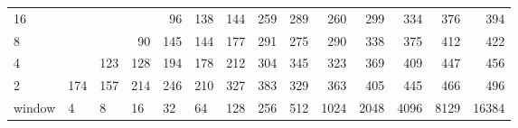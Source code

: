 \begin{table}[h]
{\begin{tabular}{lrrrrrrrrrrrrr}
			\multicolumn{1}{|l|}{16} &  &  &  & \cellcolor[HTML]{99E600}96 & \cellcolor[HTML]{99E600}138 & \cellcolor[HTML]{99E600}144 & \cellcolor[HTML]{E60000}259 & \cellcolor[HTML]{E60000}289 & \cellcolor[HTML]{E60000}260 & \cellcolor[HTML]{E60000}299 & \cellcolor[HTML]{9900E6}334 & \cellcolor[HTML]{9900E6}376 & \cellcolor[HTML]{9900E6}394 \\ \cline{1-1}
			\multicolumn{1}{|l|}{8} &  &  & \cellcolor[HTML]{99E600}90 & \cellcolor[HTML]{99E600}145 & \cellcolor[HTML]{99E600}144 & \cellcolor[HTML]{E69900}177 & \cellcolor[HTML]{E60000}291 & \cellcolor[HTML]{E60000}275 & \cellcolor[HTML]{E60000}290 & \cellcolor[HTML]{9900E6}338 & \cellcolor[HTML]{9900E6}375 & \cellcolor[HTML]{4C00E6}412 & \cellcolor[HTML]{4C00E6}422 \\ \cline{1-1}
			\multicolumn{1}{|l|}{4} &  & \cellcolor[HTML]{99E600}123 & \cellcolor[HTML]{99E600}128 & \cellcolor[HTML]{E69900}194 & \cellcolor[HTML]{E69900}178 & \cellcolor[HTML]{E69900}212 & \cellcolor[HTML]{E60000}304 & \cellcolor[HTML]{9900E6}345 & \cellcolor[HTML]{E60000}323 & \cellcolor[HTML]{9900E6}369 & \cellcolor[HTML]{9900E6}409 & \cellcolor[HTML]{4C00E6}447 & \cellcolor[HTML]{4C00E6}456 \\ \cline{1-1}
			\multicolumn{1}{|l|}{2} & \cellcolor[HTML]{E69900}174 & \cellcolor[HTML]{E69900}157 & \cellcolor[HTML]{E69900}214 & \cellcolor[HTML]{E69900}246 & \cellcolor[HTML]{E69900}210 & \cellcolor[HTML]{9900E6}327 & \cellcolor[HTML]{9900E6}383 & \cellcolor[HTML]{9900E6}329 & \cellcolor[HTML]{9900E6}363 & \cellcolor[HTML]{9900E6}405 & \cellcolor[HTML]{4C00E6}445 & \cellcolor[HTML]{4C00E6}466 & \cellcolor[HTML]{4C00E6}496 \\ \hline
			\multicolumn{1}{l|}{window} & \multicolumn{1}{l|}{4} & \multicolumn{1}{l|}{8} & \multicolumn{1}{l|}{16} & \multicolumn{1}{l|}{32} & \multicolumn{1}{l|}{64} & \multicolumn{1}{l|}{128} & \multicolumn{1}{l|}{256} & \multicolumn{1}{l|}{512} & \multicolumn{1}{l|}{1024} & \multicolumn{1}{l|}{2048} & \multicolumn{1}{l|}{4096} & \multicolumn{1}{l|}{8129} & \multicolumn{1}{l|}{16384} \\ \cline{2-14} 
		\end{tabular}
	}
\end{table}


